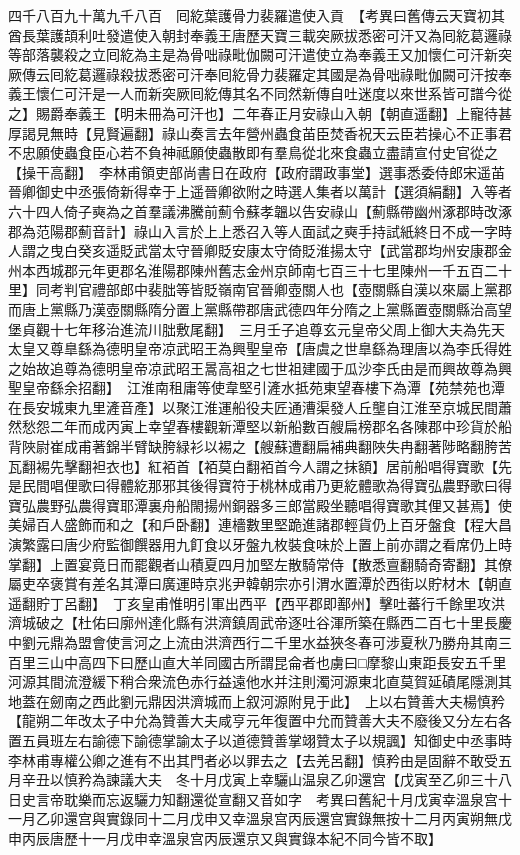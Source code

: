 四千八百九十萬九千八百　囘紇葉護骨力裴羅遣使入貢　【考異曰舊傳云天寶初其酋長葉護頡利吐發遣使入朝封奉義王唐歷天寶三載突厥拔悉密可汗又為囘紇葛邏祿等部落襲殺之立囘紇為主是為骨咄祿毗伽闕可汗遣使立為奉義王又加懷仁可汗新突厥傳云囘紇葛邏祿殺拔悉密可汗奉囘紇骨力裴羅定其國是為骨咄祿毗伽闕可汗按奉義王懷仁可汗是一人而新突厥囘紇傳其名不同然新傳自吐迷度以來世系皆可譜今從之】賜爵奉義王【明未冊為可汗也】二年春正月安祿山入朝【朝直遥翻】上寵待甚厚謁見無時【見賢遍翻】祿山奏言去年營州蟲食苖臣焚香祝天云臣若操心不正事君不忠願使蟲食臣心若不負神祗願使蟲散即有羣鳥從北來食蟲立盡請宣付史官從之【操干高翻】　李林甫領吏部尚書日在政府【政府謂政事堂】選事悉委侍郎宋遥苖晉卿御史中丞張倚新得幸于上遥晉卿欲附之時選人集者以萬計【選須絹翻】入等者六十四人倚子奭為之首羣議沸騰前薊令蘇孝韞以告安祿山【薊縣帶幽州涿郡時改涿郡為范陽郡薊音計】祿山入言於上上悉召入等人面試之奭手持試紙終日不成一字時人謂之曳白癸亥遥貶武當太守晉卿貶安康太守倚貶淮揚太守【武當郡均州安康郡金州本西城郡元年更郡名淮陽郡陳州舊志金州京師南七百三十七里陳州一千五百二十里】同考判官禮部郎中裴朏等皆貶嶺南官晉卿壺關人也【壺關縣自漢以來屬上黨郡而唐上黨縣乃漢壺關縣隋分置上黨縣帶郡唐武德四年分隋之上黨縣置壺關縣治高望堡貞觀十七年移治進流川朏敷尾翻】　三月壬子追尊玄元皇帝父周上御大夫為先天太皇又尊臯繇為德明皇帝凉武昭王為興聖皇帝【唐虞之世臯繇為理唐以為李氏得姓之始故追尊為德明皇帝凉武昭王暠高祖之七世祖建國于瓜沙李氏由是而興故尊為興聖皇帝繇余招翻】　江淮南租庸等使韋堅引滻水抵苑東望春樓下為潭【苑禁苑也潭在長安城東九里滻音產】以聚江淮運船役夫匠通漕渠發人丘壟自江淮至京城民間蕭然愁怨二年而成丙寅上幸望春樓觀新潭堅以新船數百艘扁榜郡名各陳郡中珍貨於船背陜尉崔成甫著錦半臂缺胯緑衫以裼之【艘蘇遭翻扁補典翻陜失冉翻著陟略翻胯苦瓦翻裼先擊翻袒衣也】紅袹首【袹莫白翻袹首今人謂之抹額】居前船唱得寶歌【先是民間唱俚歌曰得體紇那邪其後得寶符于桃林成甫乃更紇體歌為得寶弘農野歌曰得寶弘農野弘農得寶耶潭裏舟船閙揚州銅器多三郎當殿坐聽唱得寶歌其俚又甚焉】使美婦百人盛飾而和之【和戶卧翻】連檣數里堅跪進諸郡輕貨仍上百牙盤食【程大昌演繁露曰唐少府監御饌器用九飣食以牙盤九枚裝食味於上置上前亦謂之看席仍上時掌翻】上置宴竟日而罷觀者山積夏四月加堅左散騎常侍【散悉亶翻騎奇寄翻】其僚屬吏卒褒賞有差名其潭曰廣運時京兆尹韓朝宗亦引渭水置潭於西街以貯材木【朝直遥翻貯丁呂翻】　丁亥皇甫惟明引軍出西平【西平郡即鄯州】擊吐蕃行千餘里攻洪濟城破之【杜佑曰廓州達化縣有洪濟鎮周武帝逐吐谷渾所築在縣西二百七十里長慶中劉元鼎為盟會使言河之上流由洪濟西行二千里水益狹冬春可涉夏秋乃勝舟其南三百里三山中高四下曰歷山直大羊同國古所謂昆侖者也虜曰□摩黎山東距長安五千里河源其間流澄緩下稍合衆流色赤行益遠他水并注則濁河源東北直莫賀延磧尾隱測其地蓋在劒南之西此劉元鼎因洪濟城而上叙河源附見于此】　上以右贊善大夫楊慎矜【龍朔二年改太子中允為贊善大夫咸亨元年復置中允而贊善大夫不廢後又分左右各置五員班左右諭德下諭德掌諭太子以道德贊善掌翊贊太子以規諷】知御史中丞事時李林甫專權公卿之進有不出其門者必以罪去之【去羌呂翻】慎矜由是固辭不敢受五月辛丑以慎矜為諫議大夫　冬十月戊寅上幸驪山温泉乙卯還宫【戊寅至乙卯三十八日史言帝耽樂而忘返驪力知翻還從宣翻又音如字　考異曰舊紀十月戊寅幸溫泉宫十一月乙卯還宫與實錄同十二月戊申又幸溫泉宫丙辰還宫實錄無按十二月丙寅朔無戊申丙辰唐歷十一月戊申幸溫泉宫丙辰還京又與實錄本紀不同今皆不取】

